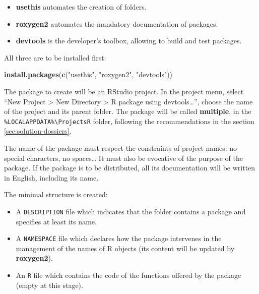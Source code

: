 \documentclass[
  12pt,
  american,
  a4paper,
  extrafontsizes,onecolumn,openright
  ]{memoir}
\newenvironment{Shaded}{\begin{snugshade}}{\end{snugshade}}
\newcommand{\FunctionTok}[1]{\textcolor[rgb]{0.13,0.29,0.53}{\textbf{#1}}}
\newcommand{\NormalTok}[1]{#1}
\newcommand{\StringTok}[1]{\textcolor[rgb]{0.31,0.60,0.02}{#1}}
\providecommand{\tightlist}{%
  \setlength{\itemsep}{0pt}\setlength{\parskip}{0pt}}
\begin{document}
\begin{itemize}
\tightlist
\item
  \textbf{usethis} automates the creation of folders.
\item
  \textbf{roxygen2} automates the mandatory documentation of packages.
\item
  \textbf{devtools} is the developer's toolbox, allowing to build and test packages.
\end{itemize}

All three are to be installed first:

\scriptsize

\begin{Shaded}
\begin{Highlighting}[]
\FunctionTok{install.packages}\NormalTok{(}\FunctionTok{c}\NormalTok{(}\StringTok{"usethis"}\NormalTok{, }\StringTok{"roxygen2"}\NormalTok{, }\StringTok{"devtools"}\NormalTok{))}
\end{Highlighting}
\end{Shaded}

\normalsize

The package to create will be an RStudio project.
In the project menu, select \enquote{New Project \textgreater{} New Directory \textgreater{} R package using devtools\ldots{}}, choose the name of the project and its parent folder.
The package will be called \textbf{multiple}, in the \texttt{\%LOCALAPPDATA\%\textbackslash{}ProjectsR} folder, following the recommendations in the section \ref{sec:solution-dossiers}.

The name of the package must respect the constraints of project names: no special characters, no spaces\ldots{}
It must also be evocative of the purpose of the package.
If the package is to be distributed, all its documentation will be written in English, including its name.

The minimal structure is created:

\begin{itemize}
\tightlist
\item
  A \texttt{DESCRIPTION} file which indicates that the folder contains a package and specifies at least its name.
\item
  A \texttt{NAMESPACE} file which declares how the package intervenes in the management of the names of R objects (its content will be updated by \textbf{roxygen2}).
\item
  An \texttt{R} file which contains the code of the functions offered by the package (empty at this stage).
\end{itemize}
\end{document}
